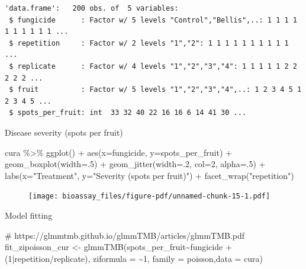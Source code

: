 \documentclass[
  letterpaper,
  DIV=11,
  numbers=noendperiod]{scrreport}
\newenvironment{Shaded}{\begin{snugshade}}{\end{snugshade}}
\newcommand{\AttributeTok}[1]{\textcolor[rgb]{0.40,0.45,0.13}{#1}}
\newcommand{\CommentTok}[1]{\textcolor[rgb]{0.37,0.37,0.37}{#1}}
\newcommand{\DecValTok}[1]{\textcolor[rgb]{0.68,0.00,0.00}{#1}}
\newcommand{\FunctionTok}[1]{\textcolor[rgb]{0.28,0.35,0.67}{#1}}
\newcommand{\NormalTok}[1]{\textcolor[rgb]{0.00,0.23,0.31}{#1}}
\newcommand{\OtherTok}[1]{\textcolor[rgb]{0.00,0.23,0.31}{#1}}
\newcommand{\SpecialCharTok}[1]{\textcolor[rgb]{0.37,0.37,0.37}{#1}}
\newcommand{\StringTok}[1]{\textcolor[rgb]{0.13,0.47,0.30}{#1}}
\begin{document}
\begin{verbatim}
'data.frame':   200 obs. of  5 variables:
 $ fungicide      : Factor w/ 5 levels "Control","Bellis",..: 1 1 1 1 1 1 1 1 1 1 ...
 $ repetition     : Factor w/ 2 levels "1","2": 1 1 1 1 1 1 1 1 1 1 ...
 $ replicate      : Factor w/ 4 levels "1","2","3","4": 1 1 1 1 1 2 2 2 2 2 ...
 $ fruit          : Factor w/ 5 levels "1","2","3","4",..: 1 2 3 4 5 1 2 3 4 5 ...
 $ spots_per_fruit: int  33 32 40 22 16 16 6 14 41 30 ...
\end{verbatim}

Disease severity (spots per fruit)

\begin{Shaded}
\begin{Highlighting}[]
\NormalTok{cura }\SpecialCharTok{\%\textgreater{}\%} 
  \FunctionTok{ggplot}\NormalTok{() }\SpecialCharTok{+} 
  \FunctionTok{aes}\NormalTok{(}\AttributeTok{x=}\NormalTok{fungicide, }\AttributeTok{y=}\NormalTok{spots\_per\_fruit) }\SpecialCharTok{+} 
  \FunctionTok{geom\_boxplot}\NormalTok{(}\AttributeTok{width=}\NormalTok{.}\DecValTok{5}\NormalTok{) }\SpecialCharTok{+} 
  \FunctionTok{geom\_jitter}\NormalTok{(}\AttributeTok{width=}\NormalTok{.}\DecValTok{2}\NormalTok{, }\AttributeTok{col=}\DecValTok{2}\NormalTok{, }\AttributeTok{alpha=}\NormalTok{.}\DecValTok{5}\NormalTok{) }\SpecialCharTok{+} 
  \FunctionTok{labs}\NormalTok{(}\AttributeTok{x=}\StringTok{"Treatment"}\NormalTok{, }\AttributeTok{y=}\StringTok{"Severity (spots per fruit)"}\NormalTok{) }\SpecialCharTok{+} 
  \FunctionTok{facet\_wrap}\NormalTok{(}\StringTok{"repetition"}\NormalTok{)}
\end{Highlighting}
\end{Shaded}

\begin{figure}[H]

{\centering \texttt{[image: bioassay\_files/figure-pdf/unnamed-chunk-15-1.pdf]}

}

\end{figure}

Model fitting

\begin{Shaded}
\begin{Highlighting}[]
\CommentTok{\# https://glmmtmb.github.io/glmmTMB/articles/glmmTMB.pdf}
\NormalTok{fit\_zipoisson\_cur }\OtherTok{\textless{}{-}} \FunctionTok{glmmTMB}\NormalTok{(spots\_per\_fruit}\SpecialCharTok{\textasciitilde{}}\NormalTok{fungicide }\SpecialCharTok{+}
\NormalTok{                               (}\DecValTok{1}\SpecialCharTok{|}\NormalTok{repetition}\SpecialCharTok{/}\NormalTok{replicate),}
                             \AttributeTok{ziformula =} \SpecialCharTok{\textasciitilde{}}\DecValTok{1}\NormalTok{, }
                             \AttributeTok{family =}\NormalTok{ poisson,}\AttributeTok{data =}\NormalTok{ cura)}
\end{Highlighting}
\end{Shaded}
\end{document}
